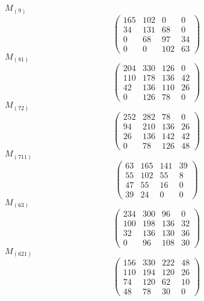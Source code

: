 \documentclass[12pt,reqno]{amsart}
\begin{document}
\Large
$M_{(9)}$                             $$ \begin{pmatrix} 
                         165 & 102 & 0 & 0 \\[6pt]
                         34 & 131 & 68 & 0 \\[6pt]
                         0 & 68 & 97 & 34 \\[6pt]
                           0 & 0 & 102 & 63
                              \end{pmatrix} $$ 
$M_{(81)}$                             $$ \begin{pmatrix} 
                        204 & 330 & 126 & 0 \\[6pt]
                       110 & 178 & 136 & 42 \\[6pt]
                        42 & 136 & 110 & 26 \\[6pt]
                           0 & 126 & 78 & 0
                              \end{pmatrix} $$ 
$M_{(72)}$                             $$ \begin{pmatrix} 
                        252 & 282 & 78 & 0 \\[6pt]
                        94 & 210 & 136 & 26 \\[6pt]
                        26 & 136 & 142 & 42 \\[6pt]
                           0 & 78 & 126 & 48
                              \end{pmatrix} $$ 
$M_{(711)}$                             $$ \begin{pmatrix} 
                        63 & 165 & 141 & 39 \\[6pt]
                         55 & 102 & 55 & 8 \\[6pt]
                         47 & 55 & 16 & 0 \\[6pt]
                            39 & 24 & 0 & 0
                              \end{pmatrix} $$ 
$M_{(63)}$                             $$ \begin{pmatrix} 
                        234 & 300 & 96 & 0 \\[6pt]
                       100 & 198 & 136 & 32 \\[6pt]
                        32 & 136 & 130 & 36 \\[6pt]
                           0 & 96 & 108 & 30
                              \end{pmatrix} $$ 
$M_{(621)}$                             $$ \begin{pmatrix} 
                       156 & 330 & 222 & 48 \\[6pt]
                       110 & 194 & 120 & 26 \\[6pt]
                        74 & 120 & 62 & 10 \\[6pt]
                           48 & 78 & 30 & 0
                              \end{pmatrix} $$ 
\end{document}

